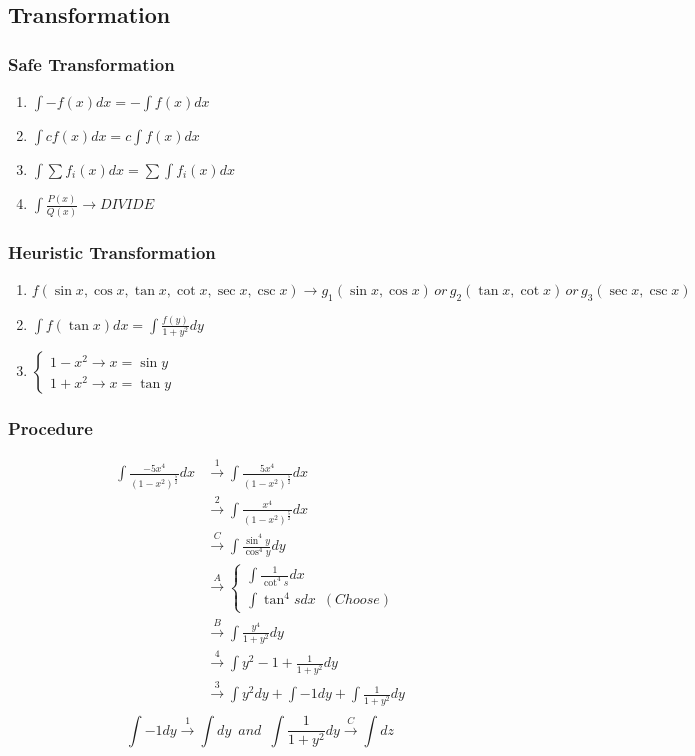 \documentclass[12pt]{book}
\begin{document}
\subsection{Transformation}
\subsubsection{Safe Transformation}
\begin{enumerate}
	\item $\int -f(x)dx=-\int f(x)dx$
	\item $\int cf(x)dx=c\int f(x)dx$
	\item $\int \sum f_i(x)dx=\sum \int f_i(x)dx$
	\item $\int \frac{P(x)}{Q(x)}\rightarrow DIVIDE$
\end{enumerate}
 
\subsubsection{Heuristic Transformation}
\begin{enumerate}[A]
 	\item 
 	$
 	f(\sin x, \cos x, \tan x, \cot x, \sec x, \csc x)\rightarrow g_1(\sin x, \cos x)\,or\,g_2(\tan x, \cot x)\,or\,g_3(\sec x, \csc x)$
 	\item 
 	$\int f(\tan x)dx =\int \frac{f(y)}{1+y^2}dy$
 	\item
	$\left\{\begin{array}{l}
	{1-x^2\rightarrow x=\sin y}  \\ {1+x^2\rightarrow x=\tan y}\end{array}\right.$
\end{enumerate}

\subsubsection{Procedure}
\begin{equation*}
\begin{aligned}
\int \frac{-5 x^{4}}{\left(1-x^{2}\right)^{\frac{5}{2}}} d x& \stackrel{1}\longrightarrow \int \frac{5 x^{4}}{\left(1-x^{2}\right)^{\frac{5}{2}}} d x \\
&\stackrel{2}\longrightarrow \int \frac{x^{4}}{\left(1-x^{2}\right)^{\frac{5}{2}}} d x\\
&\stackrel{C}\longrightarrow \int \frac{\sin^4 y}{\cos ^4 y} d y\\
&\stackrel{A}\longrightarrow\left\{\begin{array}{l}
{\int \frac{1}{\cot ^4 s}dx}  \\ {\int \tan ^4 s dx\,\,\,(Choose)}\end{array}\right.\\
&\stackrel{B}\longrightarrow\int\frac{y^4}{1+y^2} d y\\
&\stackrel{4}\longrightarrow \int y^2-1+\frac{1}{1+y^2} d y\\
&\stackrel{3}\longrightarrow\int y^2 dy+\int -1 dy+\int \frac{1}{1+y^2} dy\\
\end{aligned}
\end{equation*}
$$\int -1 dy \stackrel{1}\longrightarrow \int dy\,\,\,and\,\,\,\int \frac{1}{1+y^2} dy\stackrel{C}\longrightarrow \int dz$$
\end{document}

